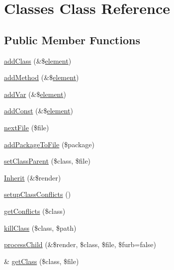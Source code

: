 \hypertarget{class_classes}{\section{\-Classes \-Class \-Reference}
\label{class_classes}
}
\subsection*{\-Public \-Member \-Functions}
\begin{DoxyCompactItemize}
\item 
\hyperlink{class_classes_aaf5da8803d8623a55e6a35693f8ba956}{add\-Class} (\&\$\hyperlink{bug-904820_8php_aa94081298ab2dfd0f261cce6c203d9aa}{element})
\item 
\hyperlink{class_classes_a6c41be64ecae850dbf85b15fdf3d63ef}{add\-Method} (\&\$\hyperlink{bug-904820_8php_aa94081298ab2dfd0f261cce6c203d9aa}{element})
\item 
\hyperlink{class_classes_a33c64321c305187dcfa399fefebb763c}{add\-Var} (\&\$\hyperlink{bug-904820_8php_aa94081298ab2dfd0f261cce6c203d9aa}{element})
\item 
\hyperlink{class_classes_a8bf5bcc54c73ae72aa43dc08dc6b1c48}{add\-Const} (\&\$\hyperlink{bug-904820_8php_aa94081298ab2dfd0f261cce6c203d9aa}{element})
\item 
\hyperlink{class_classes_a6a69b46768363126f1388bedd7750dfa}{next\-File} (\$file)
\item 
\hyperlink{class_classes_a18ef9e87b19ed34010739e309307490d}{add\-Package\-To\-File} (\$package)
\item 
\hyperlink{class_classes_ab188e9d3ebfd4674c970f95d22b5a6e6}{set\-Class\-Parent} (\$class, \$file)
\item 
\hyperlink{class_classes_ac40576cb234b55a55191a4fa3b9ed9da}{\-Inherit} (\&\$render)
\item 
\hyperlink{class_classes_a54313bc3efc8f0bdc8ecd518e16045a8}{setup\-Class\-Conflicts} ()
\item 
\hyperlink{class_classes_aa8f3eb4c8c71176a6b97f023bb2b8e48}{get\-Conflicts} (\$class)
\item 
\hyperlink{class_classes_a9e44bfe96c8baf582ec75537061a9100}{kill\-Class} (\$class, \$path)
\item 
\hyperlink{class_classes_ada1386fe9811c3aabbfe264aaf2f95a1}{process\-Child} (\&\$render, \$class, \$file, \$furb=false)
\item 
\& \hyperlink{class_classes_afbac674da956254dff5ca03d262ca031}{get\-Class} (\$class, \$file)
\item 

\end{DoxyCompactItemize}
